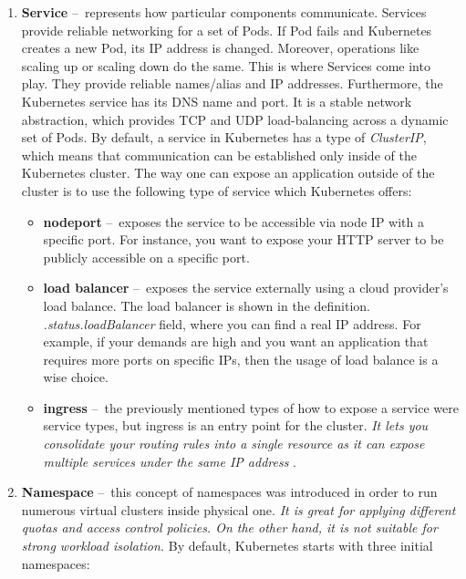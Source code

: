 \begin{enumerate}[itemsep=1mm, parsep=0pt]
    \item \textbf{Service} \---\ represents how particular components communicate.
    Services provide reliable networking for a set of Pods.
    If Pod fails and Kubernetes creates a new Pod, its IP address is changed.
    Moreover, operations like scaling up or scaling down do the same.
    This is where Services come into play.
    They provide reliable names/alias and IP addresses.
    Furthermore, the Kubernetes service has its DNS name and port.
    It is a stable network abstraction, which provides TCP and UDP load-balancing across a dynamic set of Pods.
    By default, a service in Kubernetes has a type of \emph{ClusterIP}, which means that communication can be established only inside of the Kubernetes cluster.
    The way one can expose an application outside of the cluster is to use the following type of service which Kubernetes offers:
    \begin{itemize}[itemsep=1mm, parsep=0pt]
        \item \textbf{nodeport} \---\ exposes the service to be accessible via node IP with a specific port.
        For instance, you want to expose your HTTP server to be publicly accessible on a specific port.
        \item \textbf{load balancer} \---\  exposes the service externally using a cloud provider's load balance.
        The load balancer is shown in the definition. \emph{.status.loadBalancer} field, where you can find a real IP address.
        For example, if your demands are high and you want an application that requires more ports on specific IPs, then the usage of load balance is a wise choice.
        \item \textbf{ingress} \---\  the previously mentioned types of how to expose a service were service types, but ingress is an entry point for the cluster. \textit{It lets you consolidate your routing rules into a single resource as it can expose multiple services under the same IP address} \cite{ingress}.
    \end{itemize}

    \item \textbf{Namespace} \---\ this concept of namespaces was introduced in order to run numerous virtual clusters inside physical one. \emph{It is great for applying different quotas and access control policies. On the other hand, it is not suitable for strong workload isolation.} By default, Kubernetes starts with three initial namespaces:


\end{enumerate}
